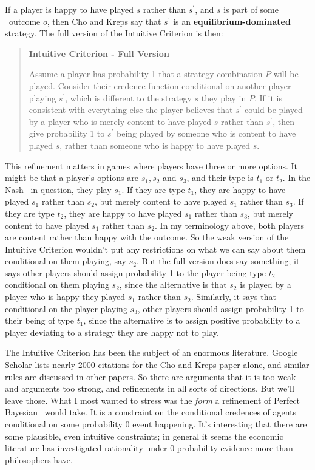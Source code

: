 \noindent If a player is happy to have played $s$ rather than $s^\prime$, and $s$ is part of some \eqm\ outcome $o$, then Cho and Kreps say that $s^\prime$ is an \textbf{equilibrium-dominated} strategy. The full version of the Intuitive Criterion is then:

\begin{quote}
\textbf{Intuitive Criterion - Full Version}

Assume a player has probability 1 that a strategy combination $P$ will be played. Consider their credence function conditional on another player playing $s^\prime$, wh\-ich is different to the strategy $s$ they play in $P$. If it is consistent with everything else the player believes that $s^\prime$ could be played by a player who is merely content to have played $s$ rather than $s^\prime$,  then give probability 1 to $s^\prime$ being played by someone who is content to have played $s$, rather than someone who is happy to have played $s$.
\end{quote}

\noindent This refinement matters in games where players have three or more options. It might be that a player's options are $s_1, s_2$ and  $s_3$, and their type is $t_1$ or $t_2$. In the Nash \eqm\ in question, they play $s_1$. If they are type $t_1$, they are happy to have played $s_1$ rather than $s_2$, but merely content to have played $s_1$ rather than $s_3$. If they are type $t_2$, they are happy to have played $s_1$ rather than $s_3$, but merely content to have played $s_1$ rather than $s_2$. In my terminology above, both players are content rather than happy with the outcome. So the weak version of the Intuitive Criterion wouldn't put any restrictions on what we can say about them conditional on them playing, say $s_2$. But the full version does say something; it says other players should assign probability 1 to the player being type $t_2$ conditional on them playing $s_2$, since the alternative is that $s_2$ is played by a player who is happy they played $s_1$ rather than $s_2$. Similarly, it says that conditional on the player playing $s_3$, other players should assign probability 1 to their being of type $t_1$, since the alternative is to assign positive probability to a player deviating to a strategy they are happy not to play.

The Intuitive Criterion has been the subject of an enormous literature. Goo\-gle Scholar lists nearly 2000 citations for the Cho and Kreps paper alone, and similar rules are discussed in other papers. So there are arguments that it is too weak and arguments too strong, and refinements in all sorts of directions. But we'll leave those. What I most wanted to stress was the \textit{form} a refinement of Perfect Bayesian \eqm\ would take. It is a constraint on the conditional credences of agents conditional on some probability 0 event happening. It's interesting that there are some plausible, even intuitive constraints; in general it seems the economic literature has investigated rationality under 0 probability evidence more than philosophers have.

